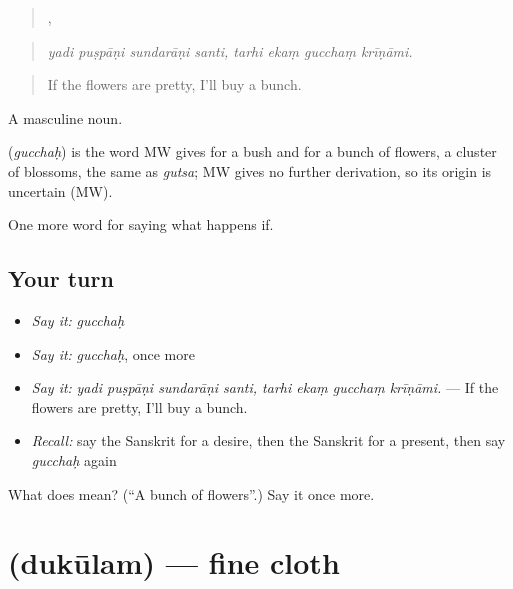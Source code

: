 \begin{quote}
   ,    
\end{quote}

\begin{quote}
\emph{yadi puṣpāṇi sundarāṇi santi, tarhi ekaṃ gucchaṃ krīṇāmi.}
\end{quote}

\begin{quote}
If the flowers are pretty, I'll buy a bunch.
\end{quote}

A masculine noun.

\begin{cousinweb}
\textbf{} (\emph{gucchaḥ}) is the word MW gives for a bush and for a bunch of flowers, a cluster of blossoms, the same as \emph{gutsa}; MW gives no further derivation, so its origin is uncertain (MW).
\end{cousinweb}

\begin{grammarlens}[title={What you've built}]
One more word for saying what happens if.
\end{grammarlens}

\subsection*{Your turn}
\begin{itemize}
\raggedright
  \item \emph{Say it:} \emph{gucchaḥ}
  \item \emph{Say it:} \emph{gucchaḥ}, once more
  \item \emph{Say it:} \emph{yadi puṣpāṇi sundarāṇi santi, tarhi ekaṃ gucchaṃ krīṇāmi.} — If the flowers are pretty, I'll buy a bunch.
  \item \emph{Recall:} say the Sanskrit for a desire, then the Sanskrit for a present, then say \emph{gucchaḥ} again
\end{itemize}

\begin{tcolorbox}[breakable,colback=teal!4,colframe=teal!35!black,title={Before you move on}]
What does  mean? (\textquotedblleft{}A bunch of flowers\textquotedblright{}.) Say it once more.
\end{tcolorbox}
\section[\texorpdfstring{\sk{दुकूलम्} (dukūlam)}{दुकूलम् (dukūlam)}]{ (dukūlam) — fine cloth}

